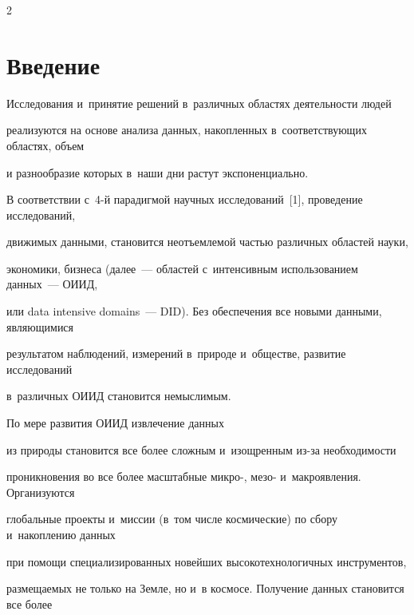 \begin{multicols}{2}





\label{st\stat}





\section{Введение}





\vspace*{-2pt}





  Исследования и~принятие решений в~различных областях деятельности людей 


реализуются на основе анализа данных, накопленных в~соответствующих областях, объем 


и разнообразие которых в~наши дни растут экспоненциально.


  


  В соответствии с~4-й парадигмой научных исследований~[1], проведение исследований, 


движимых данными, становится неотъемлемой частью различных областей науки, 


экономики, бизнеса (далее~--- областей с~интенсивным использованием данных~--- ОИИД, 


или data intensive domains~--- DID). Без обеспечения все новыми данными, являющимися 


результатом наблюдений, измерений в~природе и~обществе, развитие исследований 


в~различных ОИИД становится немыслимым. 





По мере развития ОИИД извлечение данных 


из природы становится все более сложным и~изощренным из-за необходимости 


проникновения во все более масштабные микро-, мезо- и~макроявления. Организуются 


глобальные проекты и~миссии (в~том чис\-ле космические) по сбору и~накоплению данных 


при помощи специализированных новейших высокотехнологичных инструментов, 


размещаемых не только на Земле, но и~в космосе. Получение данных становится все более 



\end{multicols}

